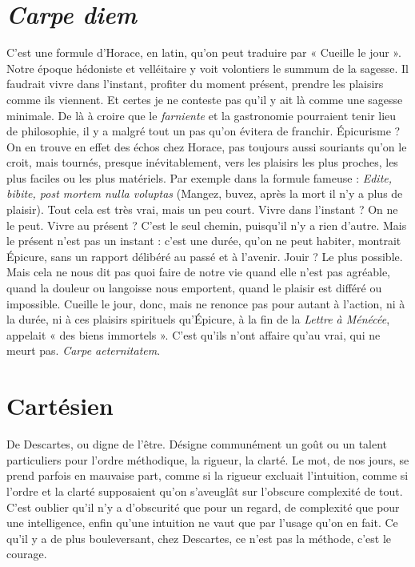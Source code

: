 \section{\it Carpe diem}
C’est une formule d'Horace, en latin, qu’on peut traduire
par « Cueille le jour ». Notre époque hédoniste et velléitaire
y voit volontiers le summum de la sagesse. Il faudrait vivre dans l’instant, profiter
du moment présent, prendre les plaisirs comme ils viennent. Et certes je
ne conteste pas qu'il y ait là comme une sagesse minimale. De là à croire que le
{\it farniente} et la gastronomie pourraient tenir lieu de philosophie, il y a malgré
tout un pas qu’on évitera de franchir. Épicurisme ? On en trouve en effet des
échos chez Horace, pas toujours aussi souriants qu’on le croit, mais tournés,
presque inévitablement, vers les plaisirs les plus proches, les plus faciles ou les
plus matériels. Par exemple dans la formule fameuse : {\it Edite, bibite, post mortem
nulla voluptas} (Mangez, buvez, après la mort il n’y a plus de plaisir). Tout cela
est très vrai, mais un peu court. Vivre dans l’instant ? On ne le peut. Vivre au
présent ? C’est le seul chemin, puisqu’il n’y a rien d’autre. Mais le présent n’est
pas un instant : c’est une durée, qu’on ne peut habiter, montrait Épicure, sans
un rapport délibéré au passé et à l'avenir. Jouir ? Le plus possible. Mais cela ne
nous dit pas quoi faire de notre vie quand elle n’est pas agréable, quand la douleur
ou langoisse nous emportent, quand le plaisir est différé ou impossible.
Cueille le jour, donc, mais ne renonce pas pour autant à l’action, ni à la durée,
ni à ces plaisirs spirituels qu’Épicure, à la fin de la {\it Lettre à Ménécée}, appelait
« des biens immortels ». C’est qu'ils n’ont affaire qu’au vrai, qui ne meurt pas.
{\it Carpe aeternitatem}.

\section{Cartésien}
De Descartes, ou digne de l’être. Désigne communément un
goût ou un talent particuliers pour l’ordre méthodique, la
rigueur, la clarté. Le mot, de nos jours, se prend parfois en mauvaise part,
comme si la rigueur excluait l'intuition, comme si l’ordre et la clarté supposaient
qu’on s’aveuglât sur l’obscure complexité de tout. C’est oublier qu’il n’y
a d’obscurité que pour un regard, de complexité que pour une intelligence,
enfin qu’une intuition ne vaut que par l’usage qu’on en fait. Ce qu’il y a de plus
bouleversant, chez Descartes, ce n’est pas la méthode, c’est le courage.

